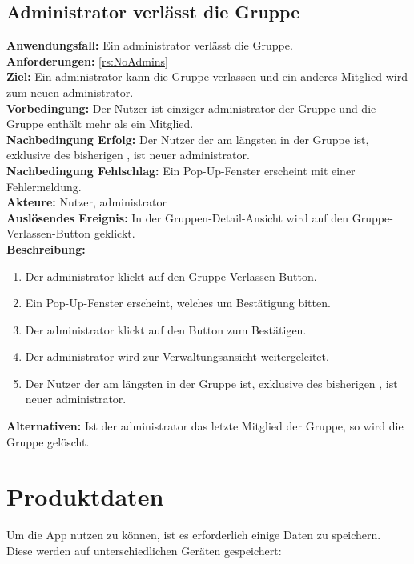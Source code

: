 \documentclass[parskip=full]{scrartcl}
\newcommand{\changelocaltocdepth}[1]{%
  \addtocontents{toc}{\protect\setcounter{tocdepth}{#1}}%
  \setcounter{tocdepth}{#1}%
}
\newcommand{\enablesubsectionnumbering}[1]{
    \renewcommand{\thesubsection}{$\langle$#1\arabic{subsection}0$\rangle$}
    \changelocaltocdepth{1} 
}
\newcommand{\resetsubsectionnumbering}{
    \renewcommand{\thesubsection}{\arabic{section}.\arabic{subsection}}
    \changelocaltocdepth{3} 
}
\begin{document}
\subsection{Administrator verlässt die Gruppe}
\textbf{Anwendungsfall:} Ein \gls{administrator} verlässt die Gruppe.\\
\textbf{Anforderungen:} \ref{rs:NoAdmins}\\
\textbf{Ziel:} Ein \gls{administrator} kann die Gruppe verlassen und ein anderes Mitglied wird zum neuen \gls{administrator}.\\
\textbf{Vorbedingung:} Der Nutzer ist einziger \gls{administrator} der Gruppe und die Gruppe enthält mehr als ein Mitglied.\\
\textbf{Nachbedingung Erfolg:} Der Nutzer der am längsten in der Gruppe ist, exklusive des bisherigen , ist neuer \gls{administrator}.\\
\textbf{Nachbedingung Fehlschlag:} Ein Pop-Up-Fenster erscheint mit einer Fehlermeldung.\\
\textbf{Akteure:} Nutzer, \gls{administrator}\\
\textbf{Auslösendes Ereignis:} In der Gruppen-Detail-Ansicht wird auf den Gruppe-Verlassen-Button geklickt.\\
\textbf{Beschreibung:}
\begin{enumerate}
    \item Der \gls{administrator} klickt auf den Gruppe-Verlassen-Button.
    \item Ein Pop-Up-Fenster erscheint, welches um Bestätigung bitten.
    \item Der \gls{administrator} klickt auf den Button zum Bestätigen.
    \item Der \gls{administrator} wird zur Verwaltungsansicht weitergeleitet.
    \item Der Nutzer der am längsten in der Gruppe ist, exklusive des bisherigen , ist neuer \gls{administrator}. 
\end{enumerate}
\textbf{Alternativen:} Ist der \gls{administrator} das letzte Mitglied der Gruppe, so wird die Gruppe gelöscht.
\newpage


\resetsubsectionnumbering


\section{Produktdaten}
\enablesubsectionnumbering{D}
Um die App nutzen zu können, ist es erforderlich einige Daten zu speichern. Diese werden auf unterschiedlichen Geräten gespeichert:
\end{document}
